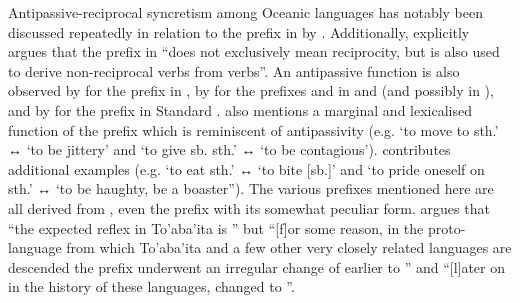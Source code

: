 Antipassive-reciprocal syncretism among Oceanic languages has notably been discussed repeatedly in relation to the prefix  in  by \cite{lichtenberk:1991, lichtenberk:2000, lichtenberk:2007}. Additionally, \cite[147, 156]{mosel:1984} explicitly argues that the prefix  in  “does not exclusively mean reciprocity, but is also used to derive non-reciprocal  verbs from  verbs”. An antipassive function is also observed by \cite[137f.]{davis:2003} for the prefix  in , by \cite[37f.]{bril:2005} for the prefixes  and  in  and  (and possibly in ), and by \cite[164]{janic:2016} for the prefix  in Standard . \cite[33, 39]{bril:2005} also mentions a marginal and lexicalised function of the  prefix  which is reminiscent of antipassivity (e.g.  ‘to move to sth.’ ↔  ‘to be jittery’ and  ‘to give sb. sth.’ ↔  ‘to be contagious’). \cite[1047]{moyse-faurie:2015} contributes additional examples (e.g.  ‘to eat sth.’ ↔  ‘to bite [sb.]’ and  ‘to pride oneself on sth.’ ↔  ‘to be haughty, be a boaster”). The various prefixes mentioned here are all derived from  , even the  prefix with its somewhat peculiar form. \cite[1566f.]{lichtenberk:2007} argues that “the expected reflex in To’aba’ita is ” but “[f]or some reason, in the proto-language from which To’aba’ita and a few other very closely related languages are descended the prefix underwent an irregular change of earlier  to ” and “[l]ater on in the history of these languages,  changed to ”.

